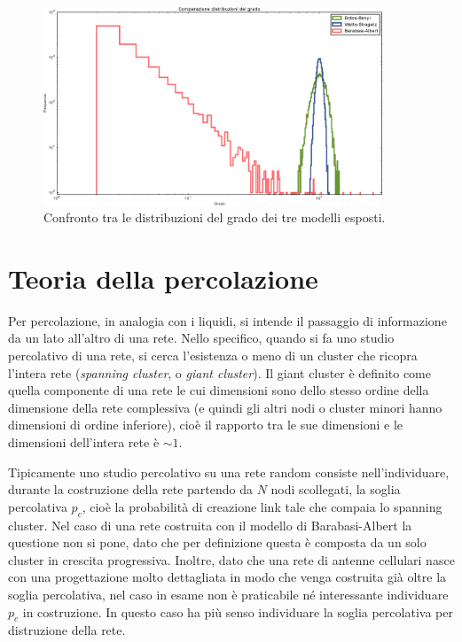 \begin{figure}[ht!]
	\centering
	\includegraphics[width=0.9\textwidth]{./Immagini/Teoria/compareSameN}
	\caption[Confronto $P(k)$]{Confronto tra le distribuzioni del grado dei tre modelli esposti.}
	\label{fig:confrontoGradi}
\end{figure}

\clearpage
\section{Teoria della percolazione}
\label{sec:percola}
Per percolazione, in analogia con i liquidi, si intende il passaggio di informazione da un lato all'altro di una rete. Nello specifico, quando si fa uno studio percolativo di una rete, si cerca l'esistenza o meno di un cluster che ricopra l'intera rete (\emph{spanning cluster}, o \emph{giant cluster}). Il giant cluster è definito come quella componente di una rete le cui dimensioni sono dello stesso ordine della dimensione della rete complessiva (e quindi gli altri nodi o cluster minori hanno dimensioni di ordine inferiore), cioè il rapporto tra le sue dimensioni e le dimensioni dell'intera rete è $\sim 1$.

Tipicamente uno studio percolativo su una rete random consiste nell'individuare, durante la costruzione della rete partendo da $N$ nodi scollegati, la soglia percolativa $p_c$, cioè la probabilità di creazione link tale che compaia lo spanning cluster. Nel caso di una rete costruita con il modello di Barabasi-Albert la questione non si pone, dato che per definizione questa è composta da un solo cluster in crescita progressiva. Inoltre, dato che una rete di antenne cellulari nasce con una progettazione molto dettagliata in modo che venga costruita già oltre la soglia percolativa, nel caso in esame non è praticabile né interessante individuare $p_c$ in costruzione. In questo caso ha più senso individuare la soglia percolativa per distruzione della rete.

